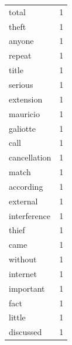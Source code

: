 \begin{tabular}{lr}
total & 1 \\
theft & 1 \\
anyone & 1 \\
repeat & 1 \\
title & 1 \\
serious & 1 \\
extension & 1 \\
mauricio & 1 \\
galiotte & 1 \\
call & 1 \\
cancellation & 1 \\
match & 1 \\
according & 1 \\
external & 1 \\
interference & 1 \\
thief & 1 \\
came & 1 \\
without & 1 \\
internet & 1 \\
important & 1 \\
fact & 1 \\
little & 1 \\
discussed & 1 \\
\bottomrule
\end{tabular}
